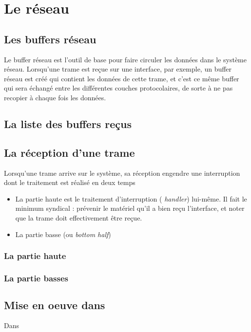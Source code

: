 %
\section{Le réseau}

%
\subsection{Les buffers réseau}

   Le buffer réseau est l'outil de base pour faire circuler les
données dans le système réseau. Lorsqu'une trame est reçue sur une
interface, par exemple, un buffer réseau est créé qui contient les
données de cette trame, et c'est ce même buffer qui sera échangé entre
les différentes couches protocolaires, de sorte à ne pas recopier à
chaque fois les données.

%
\subsection{La liste des buffers reçus}


%
\subsection{La réception d'une trame}

   Lorsqu'une trame arrive sur le système, sa réception engendre une
interruption dont le traitement est réalisé en deux temps

\begin{itemize}
   \item La partie haute est le traitement d'interruption ({\em
     handler}) lui-même. Il fait le minimum syndical : prévenir le
     matériel qu'il a bien reçu l'interface, et noter que la trame
     doit effectivement être reçue.
   \item La partie basse (ou {\em bottom half}) 
\end{itemize}     


\subsubsection{La partie haute}
\subsubsection{La partie basses
}

%
\subsection{Mise en oeuve dans \manux}

   Dans \manux
